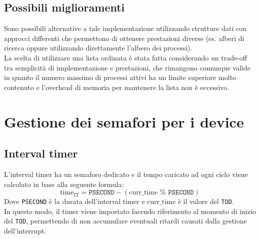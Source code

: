 \documentclass[11pt]{article}
\begin{document}
\subsection{Possibili miglioramenti}
Sono possibili alternative a tale implementazione utilizzando strutture dati con approcci differenti che permettono di ottenere prestazioni diverse (es. alberi di ricerca oppure utilizzando direttamente l'albero dei processi). \\
La scelta di utilizzare una lista ordinata è stata fatta considerando un trade-off tra semplicità di implementazione e prestazioni, che rimangono comunque valide in quanto il numero massimo di processi attivi ha un limite superiore molto contenuto e l'overhead di memoria per mantenere la lista non è eccessivo.

\newpage
\section{Gestione dei semafori per i device}
\subsection{Interval timer}
L'interval timer ha un semaforo dedicato e il tempo caricato ad ogni ciclo viene calcolato in base alla seguente formula:
\begin{equation}
    \text{time}_{\text{IT}} = \texttt{PSECOND} - (\text{curr}\_\text{time } \% \texttt{ PSECOND})
\end{equation}
Dove \texttt{PSECOND} è la durata dell'interval timer e $\text{curr}\_\text{time}$ è il valore del \texttt{TOD}.\\
In questo modo, il timer viene impostato facendo riferimento al momento di inizio del \texttt{TOD}, permettendo di non accumulare eventuali ritardi causati dalla gestione dell'interrupt.
\end{document}
